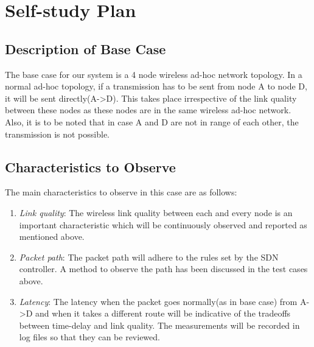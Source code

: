\documentclass{article}
\begin{document}
\section{Self-study Plan}
\subsection{Description of Base Case}
The base case for our system is a 4 node wireless ad-hoc network topology. In a normal ad-hoc topology, if a
transmission has to be sent from node A to node D, it will be sent directly(A-\textgreater D). This takes place irrespective of the
link quality between these nodes as these nodes are in the same wireless ad-hoc network. Also, it is to be noted that in
case A and D are not in range of each other, the transmission is not possible.
\subsection{Characteristics to Observe}
The main characteristics to observe in this case are as follows:
\begin{enumerate}
\item \textit{Link quality}: The wireless link quality between each and every node is an important characteristic which will be
continuously observed and reported as mentioned above. 
\item \textit{Packet path}: The packet path will adhere to the rules set by the SDN controller. A method to observe the path has
been discussed in the test cases above. 
\item \textit{Latency}: The latency when the packet goes normally(as in base case) from A-\textgreater D and when it takes a different route
will be indicative of the tradeoffs between time-delay and link quality. The measurements will be recorded in log files
so that they can be reviewed.
\end{enumerate}
\end{document}
